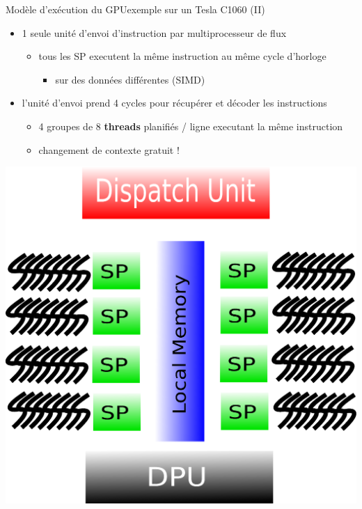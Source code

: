 \documentclass[11pt,mathserif]{beamer}
\begin{document}
\begin{frame}{Modèle d'exécution du GPU}{exemple sur un Tesla C1060 (II)}
\begin{minipage}[c]{0.49\linewidth}
\begin{itemize}
  \item 1 seule unité d'envoi d'instruction par multiprocesseur de flux
    \begin{itemize}
      \item tous les SP executent la même instruction au même cycle d'horloge
        \begin{itemize}
          \item sur des données différentes (SIMD)
        \end{itemize}
    \end{itemize}
  \item l'unité d'envoi prend 4 cycles pour récupérer et décoder les instructions
    \begin{itemize}
      \item 4 groupes de 8 {\bf threads} planifiés / ligne
    executant la même instruction
      \item changement de contexte gratuit !
    \end{itemize}
\end{itemize}
\end{minipage}
\begin{minipage}[c]{0.49\linewidth}
\begin{center}
  \includegraphics[width=0.9\linewidth]{fig/GPUArchi8Thread.eps}
\end{center}
\end{minipage}
\end{frame}
\end{document}
